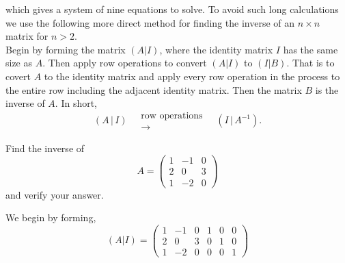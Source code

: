 \documentclass{ximera}
\begin{document}
which gives a system of nine equations to solve. To avoid such long calculations we use the following more direct method for finding the inverse of an $n\times n$ matrix for $n>2$. \\
Begin by forming the matrix $(A|I)$, where the identity matrix $I$ has the same size as $A$. Then apply row operations to convert $(A|I)$ to $(I|B)$. That is to covert $A$ to the identity matrix and apply every row operation in the process to the entire row including the adjacent identity matrix. Then the matrix $B$ is the inverse of $A$. In short,
\begin{equation}\label{method}
  (A \,|\, I)
  \quad
  \begin{matrix}
    \scriptstyle{\text{row operations}} \\ \longrightarrow
  \end{matrix}
  \quad
  (I \,|\, A^{-1}).
\end{equation}

 \begin{example}
Find the inverse of
 \[A= \left(\begin{array}{ccc}
  1 &  -1 & 0 \\
  2 &  0 & 3 \\
  1 & -2 & 0
\end{array}\right)
\]
and verify your answer.
\begin{prompt}
We begin by forming,
\[
(A|I)= \left(\begin{array}{ccc|ccc}
  1 &  -1 & 0 & 1 &0 &0 \\
  2 &  0 & 3 & 0 &1 &0\\
  1 & -2 & 0 & 0 &0 &1
\end{array}\right)
\]
\end{prompt}
\end{example}
\end{document}
